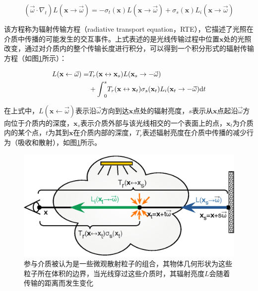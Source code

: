 \begin{equation}
	(\vec{\omega}\cdot\nabla_t)L(\mathbf{x}\to\vec{\omega})=-\sigma_t(\mathbf{x})L(\mathbf{x}\to\vec{\omega})+\sigma_s(\mathbf{x})L_i(\mathbf{x}\to\vec{\omega})
\end{equation}

\noindent 该方程称为辐射传输方程（radiative transport equation，RTE）\cite{a:RadiativeTransfer}，它描述了光照在介质中传播的可能发生的交互事件。上式表述的是光线传输过程中位置$\mathbf{x}$处的光照改变，通过对介质内的整个传输长度进行积分，可以得到一个积分形式的辐射传输方程（如图\ref{f:pm-transmittance}所示）：

\begin{equation}\label{e:pm-rte}
\begin{aligned}
	L(\mathbf{x}\leftarrow\vec{\omega})=&T_r(\mathbf{x}\leftrightarrow\mathbf{x}_s)L(\mathbf{x}_s\to -\vec{\omega})\\ &+{\rm \int}^{s}_{0}T_r(\mathbf{x}\leftrightarrow\mathbf{x}_t)\sigma_s(\mathbf{x}_t)L_i(\mathbf{x}_t\to -\vec{\omega}){\rm d}t
\end{aligned}
\end{equation}

\noindent 在上式中，$L(\mathbf{x}\leftarrow\vec{\omega})$表示沿$\vec{\omega}$方向到达$\mathbf{x}$点处的辐射亮度，$s$表示从$\mathbf{x}$点起沿$\vec{\omega}$方向位于介质内的深度，$\mathbf{x}_s$表示介质外部与该光线相交的一个表面上的点，$\mathbf{x}_t$为介质内的某个点，$t$为其到$\mathbf{x}$在介质内部的深度，$T_r$表述辐射亮度在介质中传播的减少行为（吸收和散射），如图\ref{f:pm-transmittance}所示。

\begin{figure}
	\includegraphics[width=\textwidth]{figures/pm/transmittance}
	\caption{参与介质被认为是一些微观散射粒子的组合，其物体几何形状为这些粒子所在体积的边界，当光线穿过这些介质时，其辐射亮度$L$会随着传输的距离而发生变化}
	\label{f:pm-transmittance}
\end{figure}

